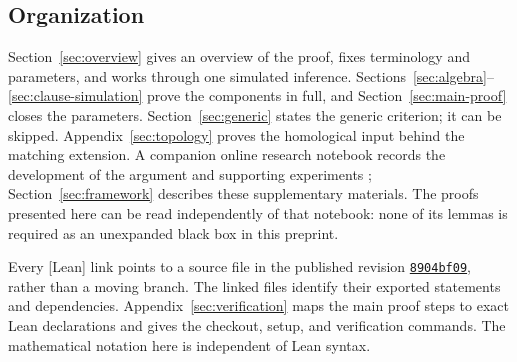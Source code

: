 \subsection{Organization}
Section~\ref{sec:overview} gives an overview of the proof, fixes terminology
and parameters, and works through one simulated inference.
Sections~\ref{sec:algebra}--\ref{sec:clause-simulation} prove the components
in full, and Section~\ref{sec:main-proof} closes the parameters.
Section~\ref{sec:generic} states the generic criterion; it can be skipped.
Appendix~\ref{sec:topology} proves the homological input behind
the matching extension. A companion online research notebook records the
development of the argument and supporting experiments \cite{Repo};
Section~\ref{sec:framework} describes these supplementary materials.
The proofs presented here can be read independently of that notebook:
none of its lemmas is required as an unexpanded black box in this preprint.

Every [Lean] link points to a source file in the published revision
\href{https://github.com/kbr-/math-research/tree/8904bf09a5376f48a00d1c25d079bf0c6441502a}{\texttt{8904bf09}}, rather than a moving
branch. The linked files identify their exported statements and dependencies.
Appendix~\ref{sec:verification} maps the main proof steps to exact Lean
declarations and gives the checkout, setup, and verification commands.
The mathematical notation here is independent of Lean syntax.
